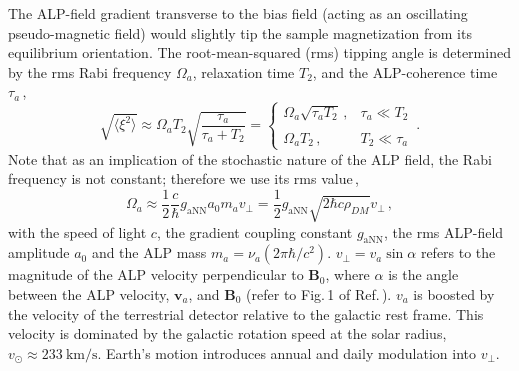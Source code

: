 The ALP-field gradient transverse to the bias field (acting as an oscillating pseudo-magnetic field) would slightly tip the sample magnetization from its equilibrium orientation.
The root-mean-squared (rms) tipping angle is determined by the rms Rabi frequency $\Omega_a$, relaxation time $T_2$, and the ALP-coherence time $\tau_a$\,\cite{Yuzhe2023_FrequencyScanning},
\begin{equation}\label{eq:tipping_angle}
    \sqrt{\langle \xi^2\rangle} \approx \Omega_a T_2 \sqrt{\frac{\tau_a}{\tau_a + T_2}} = \left\{
    \begin{array}{cl}
    \Omega_a \sqrt{\tau_a T_2}\,,
    &  \tau_a \ll T_2 \\
    & \\
    \Omega_a T_2\,,
    &  T_2 \ll \tau_a
    \end{array} \right.
    \,.
\end{equation}
Note that as an implication of the stochastic nature of the ALP field, the Rabi frequency is not constant; therefore we use its rms value\,\cite{Centers2021Stochastic},
\begin{equation}\label{eq:ALP_Rabi}
    \Omega_a \approx \frac{1}{2} \frac{c}{\hbar} g_\mathrm{aNN} a_0 m_a v_{\perp} 
    = \frac{1}{2} g_\mathrm{aNN} \sqrt{2\hbar c\rho_{DM}} v_{\perp}
    \,,
\end{equation}
with the speed of light $c$, the gradient coupling constant $g_\mathrm{aNN}$, the rms ALP-field amplitude $a_0$ and the ALP mass $m_a=\nu_a(2\pi \hbar/c^2)$.
$v_{\perp}= v_a \sin{\alpha}$ refers to the magnitude of the ALP velocity perpendicular to $\mathbf{B}_0$, where $\alpha$ is the angle between the ALP velocity, $\mathbf{v}_a$, and $\mathbf{B}_0$ (refer to Fig.\,1 of Ref.\,\cite{Gramolin2022Feb_SpectralSignatures}). 
$v_a$ is boosted by the velocity of the terrestrial detector relative to the galactic rest frame. 
This velocity is dominated by the galactic rotation speed at the solar radius, $v_{\odot}\approx\SI{233}{\km/\s}$. 
Earth's motion introduces annual and daily modulation into $v_{\perp}$. 
